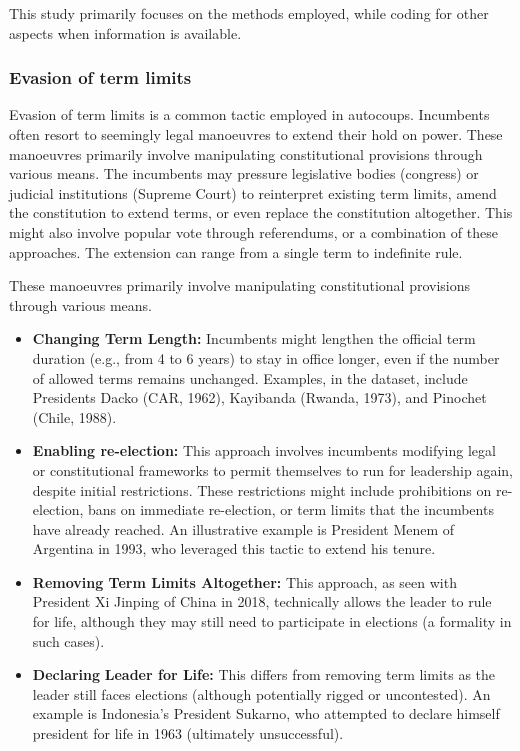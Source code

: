 \documentclass[
  12pt,
]{report}
\begin{document}
This study primarily focuses on the methods employed, while coding for
other aspects when information is available.

\subsubsection*{Evasion of term limits}\label{evasion-of-term-limits}

Evasion of term limits is a common tactic employed in autocoups.
Incumbents often resort to seemingly legal manoeuvres to extend their
hold on power. These manoeuvres primarily involve manipulating
constitutional provisions through various means. The incumbents may
pressure legislative bodies (congress) or judicial institutions (Supreme
Court) to reinterpret existing term limits, amend the constitution to
extend terms, or even replace the constitution altogether. This might
also involve popular vote through referendums, or a combination of these
approaches. The extension can range from a single term to indefinite
rule.

These manoeuvres primarily involve manipulating constitutional
provisions through various means.

\begin{itemize}
\item
  \textbf{Changing Term Length:} Incumbents might lengthen the official
  term duration (e.g., from 4 to 6 years) to stay in office longer, even
  if the number of allowed terms remains unchanged. Examples, in the
  dataset, include Presidents Dacko (CAR, 1962), Kayibanda (Rwanda,
  1973), and Pinochet (Chile, 1988).
\item
  \textbf{Enabling re-election:} This approach involves incumbents
  modifying legal or constitutional frameworks to permit themselves to
  run for leadership again, despite initial restrictions. These
  restrictions might include prohibitions on re-election, bans on
  immediate re-election, or term limits that the incumbents have already
  reached. An illustrative example is President Menem of Argentina in
  1993, who leveraged this tactic to extend his tenure.
\item
  \textbf{Removing Term Limits Altogether:} This approach, as seen with
  President Xi Jinping of China in 2018, technically allows the leader
  to rule for life, although they may still need to participate in
  elections (a formality in such cases).
\item
  \textbf{Declaring} \textbf{Leader for Life:} This differs from
  removing term limits as the leader still faces elections (although
  potentially rigged or uncontested). An example is Indonesia's
  President Sukarno, who attempted to declare himself president for life
  in 1963 (ultimately unsuccessful).
\end{itemize}
\end{document}

